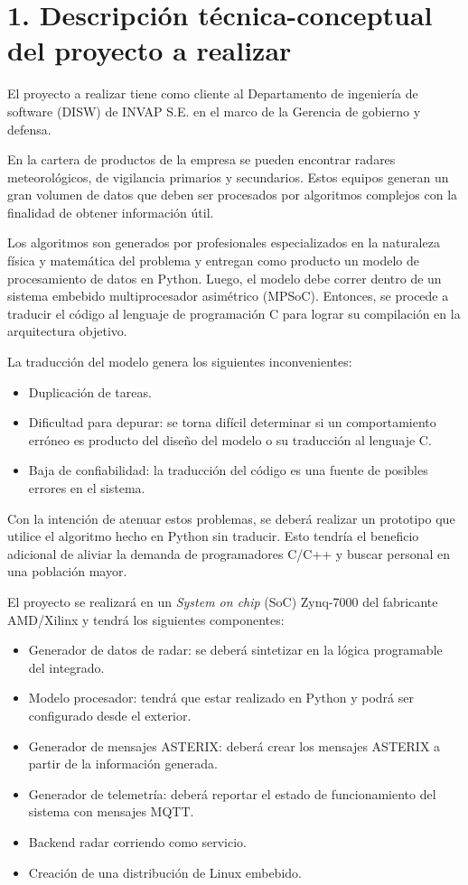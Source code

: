 \documentclass[
11pt, %
]{charter}
\begin{document}
\section{1. Descripción técnica-conceptual del proyecto a realizar}
\label{sec:descripcion}

El proyecto a realizar tiene como cliente al Departamento de ingeniería de
software (DISW) de INVAP S.E. en el marco de la Gerencia de gobierno y defensa.

En la cartera de productos de la empresa se pueden encontrar radares
meteorológicos, de vigilancia primarios y secundarios.
Estos equipos generan un gran volumen de datos que deben ser procesados por
algoritmos complejos con la finalidad de obtener información útil.

Los algoritmos son generados por profesionales especializados en la naturaleza
física y matemática del problema y entregan como producto un modelo de
procesamiento de datos en Python.
Luego, el modelo debe correr dentro de un sistema embebido multiprocesador
asimétrico (MPSoC).
Entonces, se procede a traducir el código al lenguaje de programación C para
lograr su compilación en la arquitectura objetivo.

La traducción del modelo genera los siguientes inconvenientes:

\begin{itemize}
  \item Duplicación de tareas.
  \item Dificultad para depurar: se torna difícil determinar si un
    comportamiento erróneo es producto del diseño del modelo o su traducción al
    lenguaje C.
  \item Baja de confiabilidad: la traducción del código es una fuente de
    posibles errores en el sistema.
\end{itemize}

Con la intención de atenuar estos problemas, se deberá realizar un prototipo que
utilice el algoritmo hecho en Python sin traducir. Esto tendría el beneficio
adicional de aliviar la demanda de programadores C/C++ y buscar personal en una
población mayor.

El proyecto se realizará en un \emph{System on chip} (SoC) Zynq-7000 del fabricante
AMD/Xilinx y tendrá los siguientes componentes:

\begin{itemize}
  \item Generador de datos de radar: se deberá sintetizar en la lógica
    programable del integrado.
  \item Modelo procesador: tendrá que estar realizado en Python y podrá ser
    configurado desde el exterior.
  \item Generador de mensajes ASTERIX: deberá crear los mensajes ASTERIX a
    partir de la información generada.
  \item Generador de telemetría: deberá reportar el estado de funcionamiento
    del sistema con mensajes MQTT.
  \item Backend radar corriendo como servicio.
  \item Creación de una distribución de Linux embebido.
\end{itemize}
\end{document}
